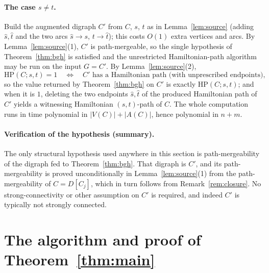 \documentclass[12pt]{article}
\theoremstyle{definition}
\begin{document}
\paragraph{The case $s\neq t$.}
Build the augmented digraph $C'$ from $C$, $s$, $t$ as in Lemma~\ref{lem:source}
(adding $\hat s,\hat t$ and the two arcs $\hat s\to s$, $t\to\hat t$); this costs
$O(1)$ extra vertices and arcs. By Lemma~\ref{lem:source}(1), $C'$ is
path-mergeable, so the single hypothesis of Theorem~\ref{thm:bgh} is satisfied and
the unrestricted Hamiltonian-path algorithm may be run on the input $G=C'$. By
Lemma~\ref{lem:source}(2),
\[
\mathrm{HP}(C;s,t)=1
\quad\Longleftrightarrow\quad
C'\text{ has a Hamiltonian path (with unprescribed endpoints),}
\]
so the value returned by Theorem~\ref{thm:bgh} on $C'$ is exactly
$\mathrm{HP}(C;s,t)$; and when it is $1$, deleting the two endpoints $\hat s,\hat t$
of the produced Hamiltonian path of $C'$ yields a witnessing Hamiltonian
$(s,t)$-path of $C$. The whole computation runs in time polynomial in
$|V(C)|+|A(C)|$, hence polynomial in $n+m$.

\paragraph{Verification of the hypothesis (summary).}
The only structural hypothesis used anywhere in this section is path-mergeability
of the digraph fed to Theorem~\ref{thm:bgh}. That digraph is $C'$, and its
path-mergeability is proved unconditionally in Lemma~\ref{lem:source}(1) from the
path-mergeability of $C=D[C_{j}]$, which in turn follows from
Remark~\ref{rem:closure}. No strong-connectivity or other assumption on $C'$ is
required, and indeed $C'$ is typically not strongly connected.

\section{The algorithm and proof of Theorem~\ref{thm:main}}
\end{document}
